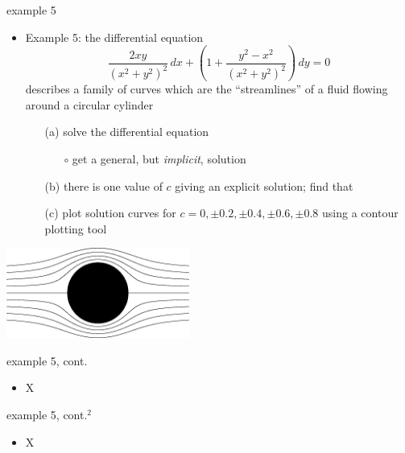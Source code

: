 \documentclass{beamer}
\begin{document}
\begin{frame}{example 5}

\begin{itemize}
\item Example 5:  the differential equation
    $$\frac{2xy}{(x^2+y^2)^2}\,dx + \left(1 + \frac{y^2-x^2}{(x^2+y^2)^2}\right)\,dy = 0$$
describes a family of curves which are the ``streamlines'' of a fluid flowing around a circular cylinder

    \begin{itemize}
    \item[(a)] solve the differential equation
        \begin{itemize}
        \item[$\circ$] get a general, but \emph{implicit}, solution
        \end{itemize}
    \item[(b)] there is one value of $c$ giving an explicit solution; find that
    \item[(c)] plot solution curves for $c=0,\pm 0.2, \pm 0.4, \pm 0.6, \pm 0.8$ using a contour plotting tool
    \end{itemize}
\end{itemize}

\vspace{-2mm}
\hfill \includegraphics[width=0.45\textwidth]{figs/streamcyl-clean}
\end{frame}


\begin{frame}{example 5, cont.}

\begin{itemize}
\item X
\end{itemize}
\end{frame}


\begin{frame}{example 5, cont.$^2$}

\begin{itemize}
\item X
\end{itemize}
\end{frame}
\end{document}
